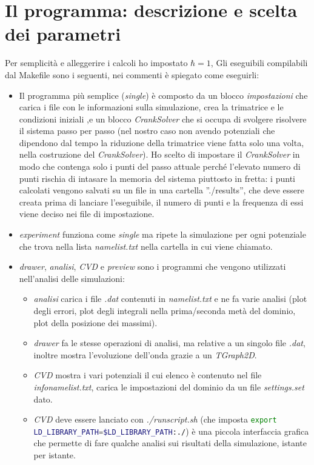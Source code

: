 \section{Il programma: descrizione e scelta dei parametri}
Per semplicit\`a e alleggerire i calcoli ho impostato $\hbar=1$, 
Gli eseguibili compilabili dal Makefile sono i seguenti, nei commenti \`e spiegato come eseguirli:

\begin{itemize}
\item Il programma pi\`u semplice (\textit{single}) \`e composto da un blocco \textit{impostazioni} che carica i file con le informazioni sulla simulazione, crea la trimatrice e le condizioni iniziali ,e un blocco \textit{CrankSolver} che si occupa di svolgere risolvere il sistema passo per passo (nel nostro caso non avendo potenziali che dipendono dal tempo la riduzione della trimatrice viene fatta solo una volta, nella costruzione del \textit{CrankSolver}).
Ho scelto di impostare il \textit{CrankSolver} in modo che contenga solo i punti del passo attuale perch\'e l'elevato numero di punti rischia di intasare la memoria del sistema piuttosto in fretta: i punti calcolati vengono salvati su un file in una cartella ''./results'', che deve essere creata prima di lanciare l'eseguibile, il numero di punti e la frequenza di essi viene deciso nei file di impostazione.
\item \textit{experiment} funziona come \textit{single} ma ripete la simulazione per ogni potenziale che trova nella lista \textit{namelist.txt} nella cartella in cui viene chiamato.
\item \textit{drawer}, \textit{analisi}, \textit{CVD} e \textit{preview} sono i programmi che vengono utilizzati nell'analisi delle simulazioni:
\begin{itemize}
\item \textit{analisi} carica i file  \textit{.dat} contenuti in \textit{namelist.txt} e ne fa varie analisi (plot degli errori, plot degli integrali nella prima/seconda met\`a del dominio, plot della posizione dei massimi).
\item \textit{drawer} fa le stesse operazioni di analisi, ma relative a un singolo file \textit{.dat}, inoltre mostra l'evoluzione dell'onda grazie a un \textit{TGraph2D}.
\item \textit{CVD} mostra i vari potenziali il cui elenco \`e contenuto nel file \textit{infonamelist.txt}, carica le impostazioni del dominio da un file \textit{settings.set} dato.
\item \textit{CVD} deve essere lanciato con \textit{./runscript.sh} (che imposta \lstinline[language = bash]|export LD_LIBRARY_PATH=$LD_LIBRARY_PATH:./|) \`e una piccola interfaccia grafica che permette di fare qualche analisi sui risultati della simulazione, istante per istante.
\end{itemize}
\end{itemize}
